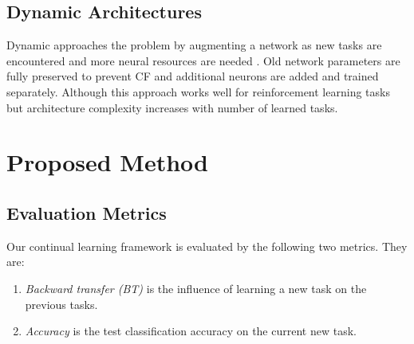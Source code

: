 \documentclass[11pt,a4paper]{article}
\begin{document}
\subsection{Dynamic Architectures} 
Dynamic approaches the problem by augmenting a network as new tasks are encountered and more neural resources are needed \cite{Rusu2016ProgressiveNN, Cortes2017AdaNetAS}. Old network parameters are fully preserved to prevent CF and additional neurons are added and trained separately. Although this approach works well for reinforcement learning tasks but architecture complexity increases with number of learned tasks.


\section{Proposed Method}
\label{sec:prop_method}

\subsection{Evaluation Metrics}
\label{sec:metric}
Our continual learning framework is evaluated by the following two metrics. They are:
\begin{enumerate}
    \item \textit{Backward transfer  (BT)} is the influence of learning a new task on the previous tasks. 
    \item \textit{Accuracy} is the test classification accuracy on the current new task.
\end{enumerate}
\end{document}

